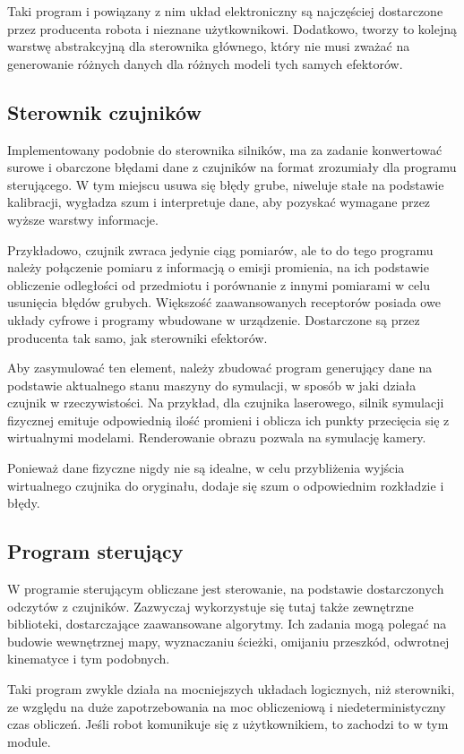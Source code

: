 		Taki program i powiązany z nim układ elektroniczny są najczęściej dostarczone przez producenta robota i nieznane użytkownikowi.
		Dodatkowo, tworzy to kolejną warstwę abstrakcyjną dla sterownika głównego, który nie musi zważać na generowanie różnych danych dla różnych modeli tych samych efektorów.
		
	\subsection{Sterownik czujników}
		Implementowany podobnie do sterownika silników, ma za zadanie konwertować surowe i obarczone błędami dane z czujników na format zrozumiały dla programu sterującego.
		W tym miejscu usuwa się błędy grube, niweluje stałe na podstawie kalibracji, wygładza szum i interpretuje dane, aby pozyskać wymagane przez wyższe warstwy informacje.

		Przykładowo, czujnik zwraca jedynie ciąg pomiarów, ale to do tego programu należy połączenie pomiaru z informacją o emisji promienia, na ich podstawie obliczenie odległości od przedmiotu i porównanie z innymi pomiarami w celu usunięcia błędów grubych.
		Większość zaawansowanych receptorów posiada owe układy cyfrowe i programy wbudowane w urządzenie.
		Dostarczone są przez producenta tak samo, jak sterowniki efektorów.
		
		Aby zasymulować ten element, należy zbudować program generujący dane na podstawie aktualnego stanu maszyny do symulacji, w sposób w jaki działa czujnik w rzeczywistości.
		Na przykład, dla czujnika laserowego, silnik symulacji fizycznej emituje odpowiednią ilość promieni i oblicza ich punkty przecięcia się z wirtualnymi modelami.
		Renderowanie obrazu pozwala na symulację kamery.

		Ponieważ dane fizyczne nigdy nie są idealne, w celu przybliżenia wyjścia wirtualnego czujnika do oryginału, dodaje się szum o odpowiednim rozkładzie i błędy.

	\subsection{Program sterujący}
		W programie sterującym obliczane jest sterowanie, na podstawie dostarczonych odczytów z czujników.
		Zazwyczaj wykorzystuje się tutaj także zewnętrzne biblioteki, dostarczające zaawansowane algorytmy.
		Ich zadania mogą polegać na budowie wewnętrznej mapy, wyznaczaniu ścieżki, omijaniu przeszkód, odwrotnej kinematyce i tym podobnych.

		Taki program zwykle działa na mocniejszych układach logicznych, niż sterowniki, ze względu na duże zapotrzebowania na moc obliczeniową
		i niedeterministyczny czas obliczeń.
		Jeśli robot komunikuje się z użytkownikiem, to zachodzi to w tym module. 

